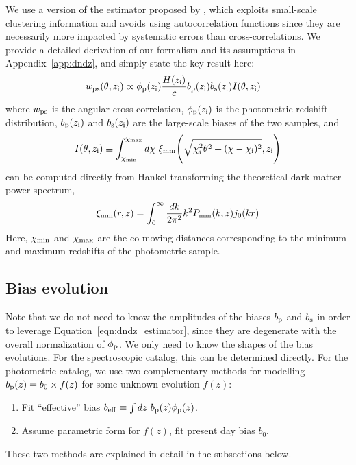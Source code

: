 \documentclass[a4paper,usenatbib]{mnras}
\begin{document}
We use a version of the estimator proposed by \cite{Menard13}, which exploits small-scale clustering information and avoids using autocorrelation functions since they are necessarily more impacted by systematic errors than cross-correlations. We provide a detailed derivation of our formalism and its assumptions in Appendix~\ref{app:dndz}, and simply state the key result here:
\begin{align}\label{eqn:dndz_estimator}
    {w}_{\rm ps}(\theta, z_{\rm i}) &\propto \phi_{\rm p}(z_{\rm i})\frac{H(z_{\rm i})}{c}b_{\rm p}(z_{\rm i})b_{\rm s}(z_{\rm i})I(\theta, z_{\rm i}) 
\end{align}
%
where ${w}_{\rm ps}$ is the angular cross-correlation, $\phi_{\rm p}(z_{\rm i})$ is the photometric redshift distribution, $b_{\rm p}(z_{\rm i})$ and $b_{\rm s}(z_{\rm i})$ are the large-scale biases of the two samples, and
%
\begin{equation}\label{I_term}
    I(\theta, z_{\rm i}) \equiv \int_{\chi_{\rm min}}^{\chi_{\rm max}}d\chi \ \xi_{\rm mm}{\Bigg (}\sqrt{\chi_{\rm i}^2\theta^2 + (\chi-\chi_{\rm i})^2},z_{\rm i}{\Bigg )}
\end{equation}
%
can be computed directly from Hankel transforming the theoretical dark matter power spectrum,
\begin{align}
    \xi_{\rm mm}(r,z) = \int_0^{\infty}\frac{dk}{2\pi^2}k^2P_{\rm mm}(k,z)j_0(kr)
\end{align}
Here, $\chi_{\rm min}$ and $\chi_{\rm max}$ are the co-moving distances corresponding to the minimum and maximum redshifts of the photometric sample.

\subsection{Bias evolution}

Note that we do not need to know the amplitudes of the biases $b_{\rm p}$ and $b_{\rm s}$ in order to leverage Equation~\ref{eqn:dndz_estimator}, since they are degenerate with the overall normalization of $\phi_{\rm p}$. We only need to know the shapes of the bias evolutions. For the spectroscopic catalog, this can be determined directly. For the photometric catalog, we use two complementary methods for modelling $b_{\rm p}(z) = b_0 \times f(z)$ for some unknown evolution $f(z)$:
\begin{enumerate}
    \item Fit ``effective'' bias $b_{\rm eff} \equiv \int dz \ b_{\rm p}(z)\phi_{\rm p}(z)$.
    \item Assume parametric form for $f(z)$, fit present day bias $b_0$.
\end{enumerate}
These two methods are explained in detail in the subsections below.
\end{document}
